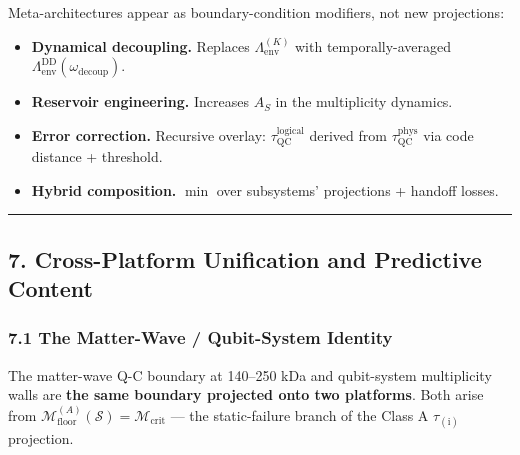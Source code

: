 \documentclass[
  11pt,
  a4paper,
]{article}
\providecommand{\tightlist}{%
  \setlength{\itemsep}{0pt}\setlength{\parskip}{0pt}}
\begin{document}
Meta-architectures appear as boundary-condition modifiers, not new
projections:

\begin{itemize}
\tightlist
\item
  \textbf{Dynamical decoupling.} Replaces
  \(\Lambda_{\mathrm{env}}^{(K)}\) with temporally-averaged
  \(\Lambda_{\mathrm{env}}^{\mathrm{DD}}(\omega_{\mathrm{decoup}})\).
\item
  \textbf{Reservoir engineering.} Increases \(A_{S}\) in the
  multiplicity dynamics.
\item
  \textbf{Error correction.} Recursive overlay:
  \(\tau_{\mathrm{QC}}^{\mathrm{logical}}\) derived from
  \(\tau_{\mathrm{QC}}^{\mathrm{phys}}\) via code distance + threshold.
\item
  \textbf{Hybrid composition.} \(\min\) over subsystems' projections +
  handoff losses.
\end{itemize}

\begin{center}\rule{0.5\linewidth}{0.5pt}\end{center}

\subsection{7. Cross-Platform Unification and Predictive
Content}\label{cross-platform-unification-and-predictive-content}

\subsubsection{7.1 The Matter-Wave / Qubit-System
Identity}\label{the-matter-wave-qubit-system-identity}

The matter-wave Q-C boundary at 140--250 kDa and qubit-system
multiplicity walls are \textbf{the same boundary projected onto two
platforms}. Both arise from
\(\mathcal{M}_{\mathrm{floor}}^{(A)}(\mathcal{S}) = \mathcal{M}_{\mathrm{crit}}\)
--- the static-failure branch of the Class A \(\tau_{(\mathrm{i})}\)
projection.
\end{document}
